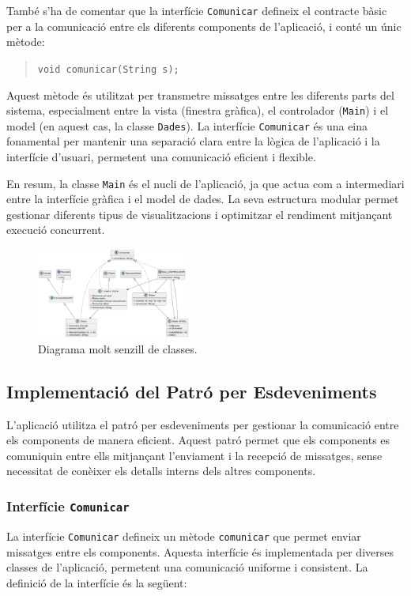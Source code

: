 \documentclass{ieeetj}
\begin{document}
\begin{itemize}
\begin{itemize}
\end{itemize}
També s'ha de comentar que la interfície \texttt{Comunicar} defineix el contracte bàsic per a la comunicació entre els diferents components de l'aplicació, i conté un únic mètode:

\begin{quote}
\texttt{void comunicar(String s);}
\end{quote}

Aquest mètode és utilitzat per transmetre missatges entre les diferents parts del sistema, especialment entre la vista (finestra gràfica), el controlador (\texttt{Main}) i el model (en aquest cas, la classe \texttt{Dades}). La interfície \texttt{Comunicar} és una eina fonamental per mantenir una separació clara entre la lògica de l'aplicació i la interfície d'usuari, permetent una comunicació eficient i flexible.

En resum, la classe \texttt{Main} és el nucli de l'aplicació, ja que actua com a intermediari entre la interfície gràfica i el model de dades. La seva estructura modular permet gestionar diferents tipus de visualitzacions i optimitzar el rendiment mitjançant execució concurrent.
\end{itemize}
\begin{figure}[htbp]
\centerline{\includegraphics[width=0.45\textwidth]{docs/png/diagrma_clases.png}}
\caption{Diagrama molt senzill de classes.}
\label{fig:digC}
\end{figure}


\subsection{Implementació del Patró per Esdeveniments}
L'aplicació utilitza el patró per esdeveniments per gestionar la comunicació entre els components de manera eficient. Aquest patró permet que els components es comuniquin entre ells mitjançant l'enviament i la recepció de missatges, sense necessitat de conèixer els detalls interns dels altres components.

\subsubsection{Interfície \texttt{Comunicar}}
La interfície \texttt{Comunicar} defineix un mètode \texttt{comunicar} que permet enviar missatges entre els components. Aquesta interfície és implementada per diverses classes de l'aplicació, permetent una comunicació uniforme i consistent. La definició de la interfície és la següent:
\end{document}
